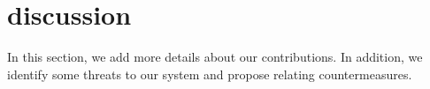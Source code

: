 \documentclass[conference]{IEEEtran}
\begin{document}
%
%
%
%
%
%
%
%
%


\section{discussion}
\label{discuss}
In this section, we add more details about our contributions. In addition, we identify some threats to our system and propose relating countermeasures.
\end{document}
